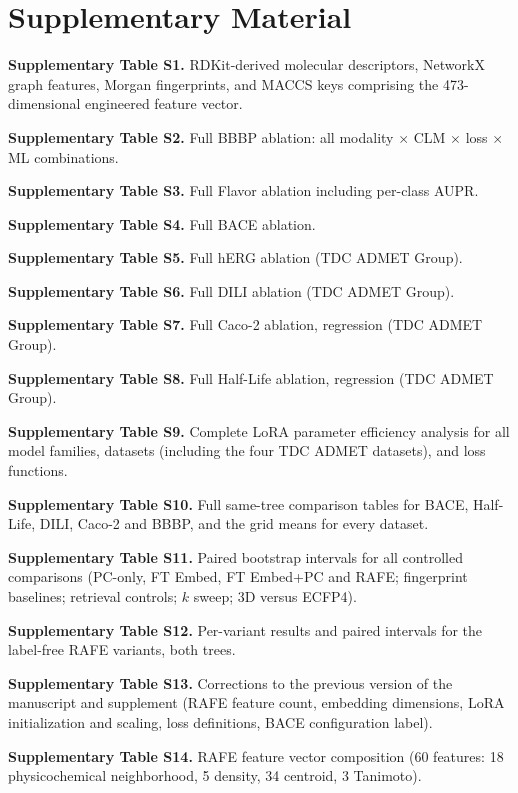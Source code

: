 \documentclass[pdflatex,sn-basic]{sn-jnl}%
\begin{document}
\section*{Supplementary Material}\label{sec:supplementary}

\noindent\textbf{Supplementary Table S1.} RDKit-derived molecular descriptors, NetworkX graph features, Morgan fingerprints, and MACCS keys comprising the 473-dimensional engineered feature vector.

\noindent\textbf{Supplementary Table S2.} Full BBBP ablation: all modality $\times$ CLM $\times$ loss $\times$ ML combinations.

\noindent\textbf{Supplementary Table S3.} Full Flavor ablation including per-class AUPR.

\noindent\textbf{Supplementary Table S4.} Full BACE ablation.

\noindent\textbf{Supplementary Table S5.} Full hERG ablation (TDC ADMET Group).

\noindent\textbf{Supplementary Table S6.} Full DILI ablation (TDC ADMET Group).

\noindent\textbf{Supplementary Table S7.} Full Caco-2 ablation, regression (TDC ADMET Group).

\noindent\textbf{Supplementary Table S8.} Full Half-Life ablation, regression (TDC ADMET Group).

\noindent\textbf{Supplementary Table S9.} Complete LoRA parameter efficiency analysis for all model families, datasets (including the four TDC ADMET datasets), and loss functions.

\noindent \textbf{Supplementary Table S10.} Full same-tree comparison tables for BACE, Half-Life, DILI, Caco-2 and BBBP, and the grid means for every dataset.

\noindent \textbf{Supplementary Table S11.} Paired bootstrap intervals for all controlled comparisons (PC-only, FT Embed, FT Embed+PC and RAFE; fingerprint baselines; retrieval controls; $k$ sweep; 3D versus ECFP4).

\noindent \textbf{Supplementary Table S12.} Per-variant results and paired intervals for the label-free RAFE variants, both trees.

\noindent \textbf{Supplementary Table S13.} Corrections to the previous version of the manuscript and supplement (RAFE feature count, embedding dimensions, LoRA initialization and scaling, loss definitions, BACE configuration label).

\noindent \textbf{Supplementary Table S14.} RAFE feature vector composition (60 features: 18 physicochemical neighborhood, 5 density, 34 centroid, 3 Tanimoto).
\end{document}
